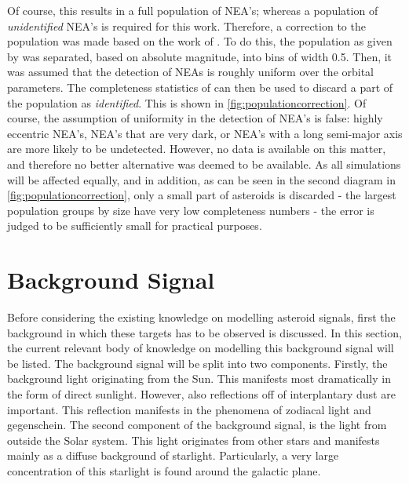 Of course, this results in a full population of NEA's; whereas a population of \textit{unidentified} NEA's is required for this work. Therefore, a correction to the population was made based on the work of \cite{HarrisPopulation}. To do this, the population as given by \cite{GranvikPopulation} was separated, based on absolute magnitude, into bins of width 0.5. Then, it was assumed that the detection of NEAs is roughly uniform over the orbital parameters. The completeness statistics of \cite{HarrisPopulation} can then be used to discard a part of the population as \textit{identified}. This is shown in \autoref{fig:populationcorrection}. Of course, the assumption of uniformity in the detection of NEA's is false: highly eccentric NEA's, NEA's that are very dark, or NEA's with a long semi-major axis are more likely to be undetected. However, no data is available on this matter, and therefore no better alternative was deemed to be available. As all simulations will be affected equally, and in addition, as can be seen in the second diagram in \autoref{fig:populationcorrection}, only a small part of asteroids is discarded - the largest population groups by size have very low completeness numbers - the error is judged to be sufficiently small for practical purposes.

\section{Background Signal}
\label{sec:modelling_background}
Before considering the existing knowledge on modelling asteroid signals, first the background in which these targets has to be observed is discussed. In this section, the current relevant body of knowledge on modelling this background signal will be listed. The background signal will be split into two components. Firstly, the background light originating from the Sun. This manifests most dramatically in the form of direct sunlight. However, also reflections off of interplantary dust are important. This reflection manifests in the phenomena of zodiacal light and gegenschein. The second component of the background signal, is the light from outside the Solar system. This light originates from other stars and manifests mainly as a diffuse background of starlight. Particularly, a very large concentration of this starlight is found around the galactic plane. \\

